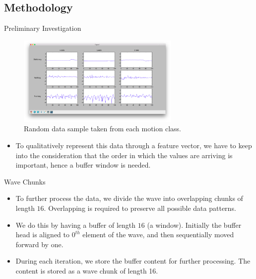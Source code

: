\documentclass{beamer}
\begin{document}
\subsection{Methodology}
\begin{frame}{Preliminary Investigation}
  \begin{figure}[h]
  \centering
  \includegraphics[width=0.7\textwidth]{raw_data.png}
  \caption{Random data sample taken from each motion class.}
  \end{figure}
  \begin{itemize}
  \item {
    To qualitatively represent this data through a feature vector, we have to keep into the consideration that the order in which the values are arriving is important, hence a buffer window is needed.
  }
  \end{itemize}
\end{frame}
\begin{frame}{Wave Chunks}
  \begin{itemize}
  \item {
    To further process the data, we divide the wave into overlapping chunks of length $16$. Overlapping is required to preserve all possible data patterns.
  }
  \item {
    We do this by having a buffer of length $16$ (a window). Initially the buffer head is aligned to $0^{th}$ element of the wave, and then sequentially moved forward by one.
  }
  \item{
    During each iteration, we store the buffer content for further processing. The content is stored as a wave chunk of length 16.
  }
  \end{itemize}
\end{frame}
\end{document}

